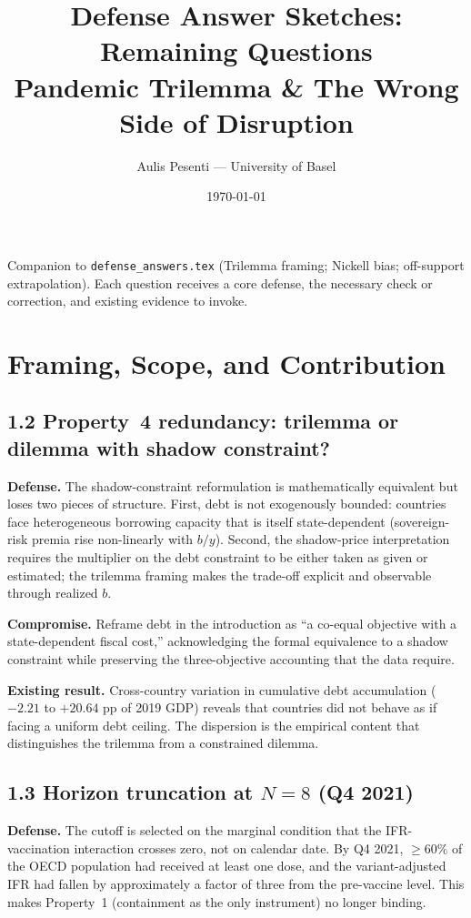 \documentclass[11pt,a4paper]{article}
\title{Defense Answer Sketches: Remaining Questions \\
\large Pandemic Trilemma \& The Wrong Side of Disruption}
\author{Aulis Pesenti --- University of Basel}
\date{\today}
\begin{document}
\maketitle

\noindent Companion to \texttt{defense\_answers.tex} (Trilemma framing; Nickell bias; off-support extrapolation). Each question receives a core defense, the necessary check or correction, and existing evidence to invoke.

\section{Framing, Scope, and Contribution}

\subsection*{1.2 Property~4 redundancy: trilemma or dilemma with shadow constraint?}

\textbf{Defense.} The shadow-constraint reformulation is mathematically equivalent but loses two pieces of structure. First, debt is not exogenously bounded: countries face heterogeneous borrowing capacity that is itself state-dependent (sovereign-risk premia rise non-linearly with $b/y$). Second, the shadow-price interpretation requires the multiplier on the debt constraint to be either taken as given or estimated; the trilemma framing makes the trade-off explicit and observable through realized $b$.

\textbf{Compromise.} Reframe debt in the introduction as ``a co-equal objective with a state-dependent fiscal cost,'' acknowledging the formal equivalence to a shadow constraint while preserving the three-objective accounting that the data require.

\textbf{Existing result.} Cross-country variation in cumulative debt accumulation ($-2.21$ to $+20.64$ pp of 2019 GDP) reveals that countries did not behave as if facing a uniform debt ceiling. The dispersion is the empirical content that distinguishes the trilemma from a constrained dilemma.

\subsection*{1.3 Horizon truncation at $N=8$ (Q4 2021)}

\textbf{Defense.} The cutoff is selected on the marginal condition that the IFR-vaccination interaction crosses zero, not on calendar date. By Q4 2021, $\geq 60\%$ of the OECD population had received at least one dose, and the variant-adjusted IFR had fallen by approximately a factor of three from the pre-vaccine level. This makes Property~1 (containment as the only instrument) no longer binding.
\end{document}
